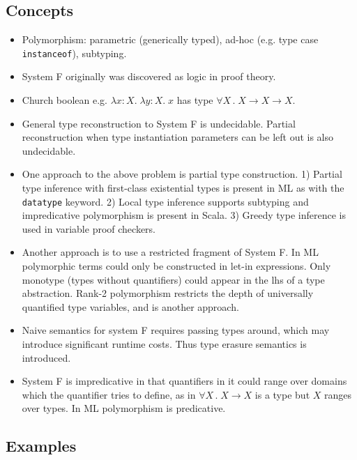 \documentclass{article}
\newcommand{\lamt}[3]{\lambda #1: #2 .\;#3}
\newcommand{\uquant}[2]{\forall #1 \, .\; #2}
\begin{document}
\subsection{Concepts}
  \begin{itemize}
    \item Polymorphism: parametric (generically typed), ad-hoc (e.g. type case \verb|instanceof|), subtyping.
    \item System F originally was discovered as logic in proof theory.
    \item Church boolean e.g. $\lamt{x}{X}{\lamt{y}{X}{x}}$ has type $\uquant{X}{X\to X\to X}$.
    \item General type reconstruction to System F is undecidable.
      Partial reconstruction when type instantiation parameters can be left out
      is also undecidable.
    \item One approach to the above problem is partial type construction.
      1) Partial type inference with first-class existential types is present
      in ML as with the \verb|datatype| keyword.
      2) Local type inference supports subtyping and impredicative polymorphism
      is present in Scala.
      3) Greedy type inference is used in variable proof checkers.
    \item Another approach is to use a restricted fragment of System F.
      In ML polymorphic terms could only be constructed in let-in expressions.
      Only monotype (types without quantifiers) could appear in the lhs of a type abstraction.
      Rank-2 polymorphism restricts the depth of universally quantified type variables, and is another approach.

    \item Naive semantics for system F requires passing types around, which may introduce significant runtime costs. Thus type erasure semantics is introduced.

    \item System F is impredicative in that quantifiers in it could range over
      domains which the quantifier tries to define, as in $\uquant{X}{X\to X}$
      is a type but $X$ ranges over types. In ML polymorphism is predicative.
  \end{itemize}

\subsection{Examples}
\end{document}
